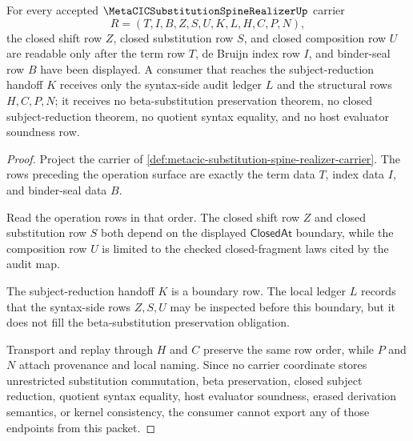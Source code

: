 \begin{theorem}
\label{thm:metacic-substitution-spine-realizer-boundary}
For every accepted $\MetaCICSubstitutionSpineRealizerUp$ carrier
$$
R=(T,I,B,Z,S,U,K,L,H,C,P,N),
$$
the closed shift row $Z$, closed substitution row $S$, and closed composition row $U$ are readable only after the term row $T$, de Bruijn index row $I$, and binder-seal row $B$ have been displayed. A consumer that reaches the subject-reduction handoff $K$ receives only the syntax-side audit ledger $L$ and the structural rows $H,C,P,N$; it receives no beta-substitution preservation theorem, no closed subject-reduction theorem, no quotient syntax equality, and no host evaluator soundness row.
\end{theorem}
\begin{proof}
Project the carrier of \autoref{def:metacic-substitution-spine-realizer-carrier}. The rows preceding the operation surface are exactly the term data $T$, index data $I$, and binder-seal data $B$.

Read the operation rows in that order. The closed shift row $Z$ and closed substitution row $S$ both depend on the displayed $\mathsf{ClosedAt}$ boundary, while the composition row $U$ is limited to the checked closed-fragment laws cited by the audit map.

The subject-reduction handoff $K$ is a boundary row. The local ledger $L$ records that the syntax-side rows $Z,S,U$ may be inspected before this boundary, but it does not fill the beta-substitution preservation obligation.

Transport and replay through $H$ and $C$ preserve the same row order, while $P$ and $N$ attach provenance and local naming. Since no carrier coordinate stores unrestricted substitution commutation, beta preservation, closed subject reduction, quotient syntax equality, host evaluator soundness, erased derivation semantics, or kernel consistency, the consumer cannot export any of those endpoints from this packet.
\end{proof}


